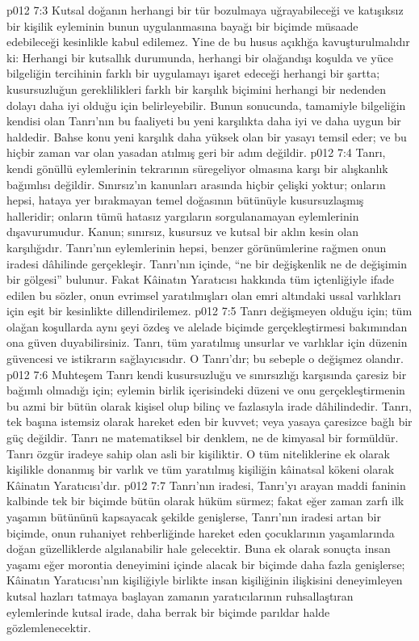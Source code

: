 \vs p012 7:3 Kutsal doğanın herhangi bir tür bozulmaya uğrayabileceği ve katışıksız bir kişilik eyleminin bunun uygulanmasına bayağı bir biçimde müsaade edebileceği kesinlikle kabul edilemez. Yine de bu husus açıklığa kavuşturulmalıdır ki: Herhangi bir kutsallık durumunda, herhangi bir olağandışı koşulda ve yüce bilgeliğin tercihinin farklı bir uygulamayı işaret edeceği herhangi bir şartta;  kusursuzluğun gereklilikleri farklı bir karşılık biçimini herhangi bir nedenden dolayı daha iyi olduğu için belirleyebilir. Bunun sonucunda, tamamiyle bilgeliğin kendisi olan Tanrı’nın bu faaliyeti bu yeni karşılıkta daha iyi ve daha uygun bir haldedir. Bahse konu yeni karşılık daha yüksek olan bir yasayı temsil eder; ve bu hiçbir zaman var olan yasadan atılmış geri bir adım değildir.
\vs p012 7:4 Tanrı, kendi gönüllü eylemlerinin tekrarının süregeliyor olmasına karşı bir alışkanlık bağımlısı değildir. Sınırsız’ın kanunları arasında hiçbir çelişki yoktur; onların hepsi, hataya yer bırakmayan temel doğasının bütünüyle kusursuzlaşmış halleridir; onların tümü hatasız yargıların sorgulanamayan eylemlerinin dışavurumudur. Kanun; sınırsız, kusursuz ve kutsal bir aklın kesin olan karşılığıdır. Tanrı’nın eylemlerinin hepsi, benzer görünümlerine rağmen onun iradesi dâhilinde gerçekleşir. Tanrı’nın içinde, “ne bir değişkenlik ne de değişimin bir gölgesi” bulunur. Fakat Kâinatın Yaratıcısı hakkında tüm içtenliğiyle ifade edilen bu sözler, onun evrimsel yaratılmışları olan emri altındaki ussal varlıkları için eşit bir kesinlikte dillendirilemez.
\vs p012 7:5 Tanrı değişmeyen olduğu için; tüm olağan koşullarda aynı şeyi özdeş ve alelade biçimde gerçekleştirmesi bakımından ona güven duyabilirsiniz. Tanrı, tüm yaratılmış unsurlar ve varlıklar için düzenin güvencesi ve istikrarın sağlayıcısıdır. O Tanrı’dır; bu sebeple o değişmez olandır.
\vs p012 7:6 Muhteşem Tanrı kendi kusursuzluğu ve sınırsızlığı karşısında çaresiz bir bağımlı olmadığı için; eylemin birlik içerisindeki düzeni ve onu gerçekleştirmenin bu azmi bir bütün olarak kişisel olup bilinç ve fazlasıyla irade dâhilindedir. Tanrı, tek başına istemsiz olarak hareket eden bir kuvvet; veya yasaya çaresizce bağlı bir güç değildir. Tanrı ne matematiksel bir denklem, ne de kimyasal bir formüldür. Tanrı özgür iradeye sahip olan asli bir kişiliktir. O tüm niteliklerine ek olarak kişilikle donanmış bir varlık ve tüm yaratılmış kişiliğin kâinatsal kökeni olarak Kâinatın Yaratıcısı’dır.
\vs p012 7:7 Tanrı’nın iradesi, Tanrı’yı arayan maddi faninin kalbinde tek bir biçimde bütün olarak hüküm sürmez; fakat eğer zaman zarfı ilk yaşamın bütününü kapsayacak şekilde genişlerse, Tanrı’nın iradesi artan bir biçimde, onun ruhaniyet rehberliğinde hareket eden çocuklarının yaşamlarında doğan güzelliklerde algılanabilir hale gelecektir. Buna ek olarak sonuçta insan yaşamı eğer morontia deneyimini içinde alacak bir biçimde daha fazla genişlerse; Kâinatın Yaratıcısı’nın kişiliğiyle birlikte insan kişiliğinin ilişkisini deneyimleyen kutsal hazları tatmaya başlayan zamanın yaratıcılarının ruhsallaştıran eylemlerinde kutsal irade, daha berrak bir biçimde parıldar halde gözlemlenecektir.
